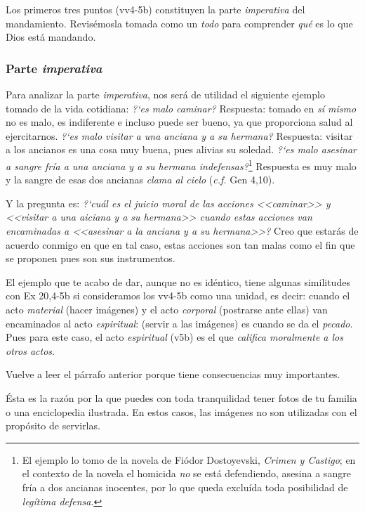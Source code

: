 \documentclass{article}
\begin{document}
\noindent
Los primeros tres puntos (vv4-5b) constituyen la parte \emph{imperativa} del mandamiento. Revis\'emosla tomada como un \emph{todo} para comprender \emph{qu\'e} es lo que Dios est\'a mandando.

\subsubsection{Parte \emph{imperativa}}

Para analizar la parte \emph{imperativa}, nos ser\'a de utilidad el siguiente ejemplo tomado de la vida cotidiana: \emph{?`es malo caminar?} Respuesta: tomado en \emph{s\'i mismo} no es malo, es indiferente e incluso puede ser bueno, ya que proporciona salud al ejercitarnos. \emph{?`es malo visitar a una anciana y a su hermana?} Respuesta: visitar a los ancianos es una cosa muy buena, pues alivias su soledad. \emph{?`es malo asesinar a sangre fr\'{i}a a una anciana y a su hermana indefensas?}\footnote{El ejemplo lo tomo de la novela de Fiódor Dostoyevski, \emph{Crimen y Castigo}; en el contexto de la novela el homicida \emph{no} se est\'a defendiendo, asesina a sangre fr\'{i}a a dos ancianas inocentes, por lo que queda exclu\'{i}da toda posibilidad de \emph{leg\'{i}tima defensa}.} Respuesta es muy malo y la sangre de esas dos ancianas \emph{clama al cielo} (\emph{c.f.} Gen 4,10).

Y la pregunta es: \emph{?`cu\'al es el juicio moral de las acciones <<caminar>> y <<visitar a una aiciana y a su hermana>> cuando estas acciones van encaminadas a <<asesinar a la anciana y a su hermana>>?} Creo que estar\'as de acuerdo conmigo en que en tal caso, estas acciones son tan malas como el fin que se proponen pues son sus instrumentos.

El ejemplo que te acabo de dar, aunque no es id\'entico, tiene algunas similitudes con Ex 20,4-5b si consideramos los vv4-5b como una unidad, es decir: cuando el acto \emph{material} (hacer im\'agenes) y el acto \emph{corporal} (postrarse ante ellas) van encaminados al acto \emph{espiritual}: (servir a las im\'agenes) es cuando se da el \emph{pecado}. Pues para este caso, el acto \emph{espiritual} (v5b) es el que \emph{califica moralmente a los otros actos}.

Vuelve a leer el p\'arrafo anterior porque tiene consecuencias muy importantes.

\'Esta es la raz\'on por la que puedes con toda tranquilidad tener fotos de tu familia o una enciclopedia ilustrada. En estos casos, las im\'agenes no son utilizadas con el prop\'osito de servirlas.
\end{document}

